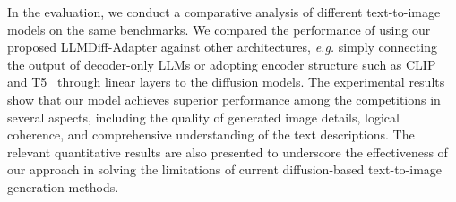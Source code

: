 In the evaluation, we conduct a comparative analysis of different text-to-image models on the same benchmarks. We compared the performance of using our proposed LLMDiff-Adapter against other architectures, \emph{e.g.} simply connecting the output of decoder-only LLMs or adopting encoder structure such as CLIP~\cite{CLIP} and T5~\cite{T5} through linear layers to the diffusion models. The experimental results show that our model achieves superior performance among the competitions in several aspects, including the quality of generated image details, logical coherence, and comprehensive understanding of the text descriptions. The relevant quantitative results are also presented to underscore the effectiveness of our approach in solving the limitations of current diffusion-based text-to-image generation methods.

